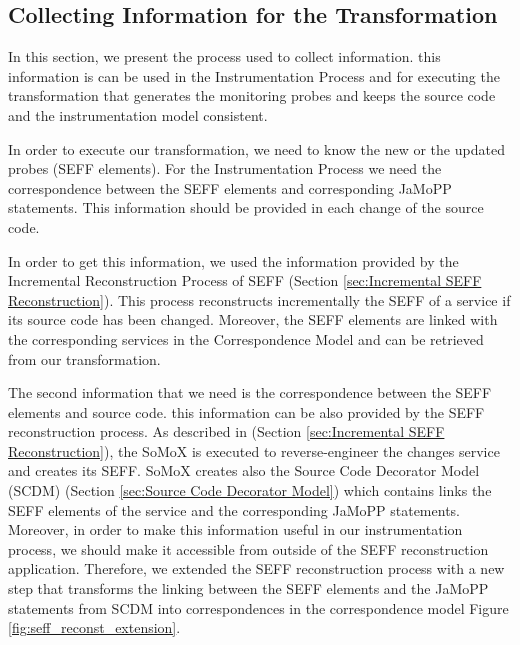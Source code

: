 \subsection{Collecting Information for the Transformation}
\label{sec:Collecting Information for the Transformation}
In this section, we present the process used to collect information. this information is can be used in the Instrumentation Process and for executing the transformation that generates the monitoring probes and keeps the source code and the instrumentation model consistent.

In order to execute our transformation, we need to know the new or the updated probes (SEFF elements).  For the Instrumentation Process we need the correspondence between the SEFF elements and corresponding JaMoPP statements. This information should be provided in each change of the source code. 

In order to get this information, we used the information provided by the Incremental Reconstruction Process of SEFF (Section \ref{sec:Incremental SEFF Reconstruction}). This process reconstructs incrementally the SEFF of a service if its source code has been changed. Moreover, the SEFF elements are linked with the corresponding services in the Correspondence Model and can be retrieved from our transformation.

The second information that we need is the correspondence between the SEFF elements and source code. this information can be also provided by the SEFF reconstruction process. As described in (Section \ref{sec:Incremental SEFF Reconstruction}), the SoMoX is executed to reverse-engineer the changes service and creates its SEFF. SoMoX creates also the Source Code Decorator Model (SCDM) (Section \ref{sec:Source Code Decorator Model}) which contains links the SEFF elements of the service and the corresponding JaMoPP statements. Moreover, in order to make this information useful in our instrumentation process, we should make it accessible from outside of the SEFF reconstruction application. Therefore, we extended the SEFF reconstruction process with a new step that transforms the linking between the SEFF elements and the JaMoPP statements from SCDM into correspondences in the correspondence model Figure \ref{fig:seff_reconst_extension}. 


